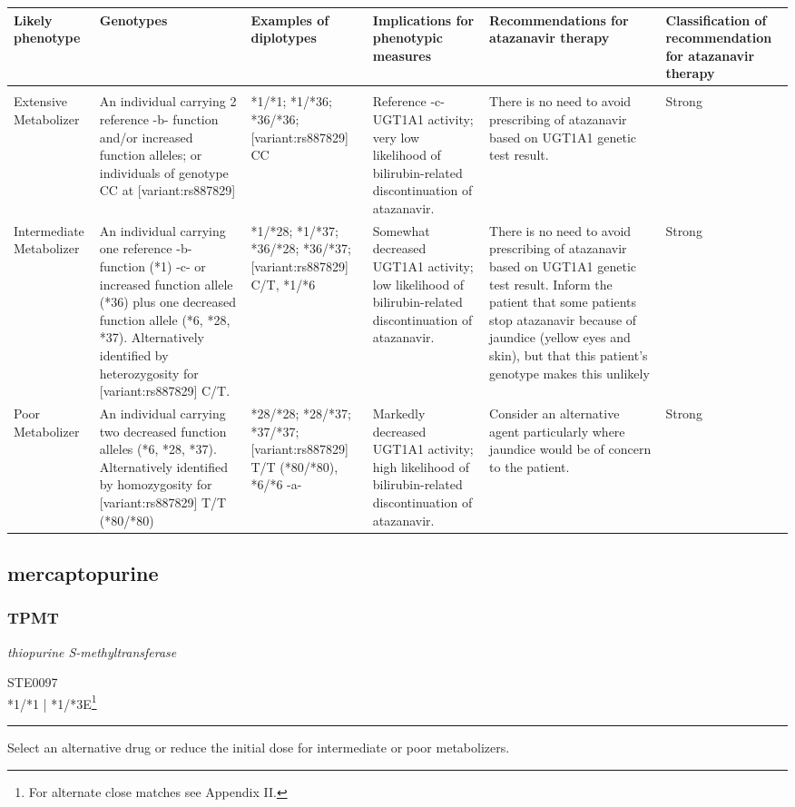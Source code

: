 \documentclass{report}
\begin{document}
      \begin{tabularx}{\textwidth}{ XXXXXX }
      \textbf{ Likely phenotype }&\textbf{ Genotypes }&\textbf{ Examples of diplotypes }&\textbf{ Implications for phenotypic measures   }&\textbf{ Recommendations for atazanavir therapy }&\textbf{ Classification of recommendation for atazanavir therapy } \\ \hline \\ Extensive Metabolizer & An individual carrying 2 reference -b- function and/or increased function alleles; or individuals of genotype CC at [variant:rs887829] & *1/*1; *1/*36; *36/*36; [variant:rs887829] CC& Reference -c- UGT1A1 activity; very low likelihood of bilirubin-related discontinuation of atazanavir.  &  There is no need to avoid prescribing of atazanavir based on UGT1A1 genetic test result.  &  Strong  \\ Intermediate Metabolizer  & An individual carrying one reference -b- function (*1) -c- or increased function allele (*36) plus one decreased function allele (*6, *28, *37). Alternatively identified by heterozygosity for [variant:rs887829] C/T. & *1/*28; *1/*37; *36/*28; *36/*37; [variant:rs887829] C/T, *1/*6 & Somewhat decreased UGT1A1 activity; low likelihood of bilirubin-related discontinuation of atazanavir. & There is no need to avoid prescribing of atazanavir based on UGT1A1 genetic test result. Inform the patient that some patients stop atazanavir because of jaundice (yellow eyes and skin), but that this patient’s genotype makes this unlikely &  Strong  \\ Poor Metabolizer  & An individual carrying two decreased function alleles (*6, *28, *37). Alternatively identified by homozygosity for [variant:rs887829] T/T (*80/*80) & *28/*28; *28/*37; *37/*37; [variant:rs887829] T/T (*80/*80), *6/*6 -a- & Markedly decreased UGT1A1 activity; high likelihood of bilirubin-related discontinuation of atazanavir. & Consider an alternative agent particularly where jaundice would be of concern to the patient. &  Strong  \\ 
      \end{tabularx}
      
      \normalsize



\subsection{ mercaptopurine }

\subsubsection{ TPMT }
     \textit{ thiopurine S-methyltransferase } \begin{flushright} \textsc{ STE0097 \\ *1/*1  | *1/*3E\footnote{For alternate close matches see Appendix II.} }\end{flushright}
      \hrule \vspace{6pt}
      Select an alternative drug or reduce the initial dose for intermediate or poor metabolizers. \newline
      \scriptsize
      
\end{document}
